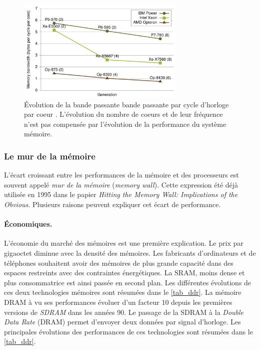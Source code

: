 \begin{figure}
    \center
    \includegraphics[width=8cm]{images/cpu_bw_per_core.png}
    \caption{Évolution de la bande passante bande passante par cycle d'horloge par coeur  \cite{CacheInjection}. L'évolution du nombre de coeurs et de leur fréquence n'est pas compensée par l'évolution de la performance du système mémoire.
    \label{pic_cpu_bw_per_core}}
\end{figure}



\subsubsection{Le mur de la mémoire}\label{sec:memory_wall_gap}
L'écart croissant entre les performances de la mémoire et des processeurs est souvent appelé \textit{mur de la mémoire} (\textit{memory wall}). Cette expression été déjà utilisée en 1995 \cite{Wulf1995} dans le papier \textit{Hitting the Memory Wall: Implications of the Obvious}. Plusieurs raisons peuvent expliquer cet écart de performance.


\paragraph{Économiques.}
L'économie du marché des mémoires est une première explication. Le prix par gigaoctet diminue avec la densité des mémoires. Les fabricants d'ordinateurs et de téléphones souhaitent avoir des mémoires de plus grande capacité dans des espaces restreints avec des contraintes énergétiques. La SRAM, moins dense et plus consommatrice est ainsi passée en second plan. Les différentes évolutions de ces deux technologies mémoires sont résumées dans le \autoref{tab_ddr}.  La mémoire DRAM à vu ses performances évoluer d'un facteur 10 depuis les premières versions de \textit{SDRAM} dans les années 90. Le passage de la SDRAM à la \textit{Double Data Rate} (DRAM) permet d'envoyer deux données par signal d'horloge. Les principales évolutions des performances de ces technologies sont résumées dans le \autoref{tab_ddr}. 

